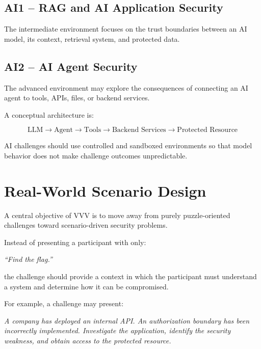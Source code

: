 \documentclass[11pt,a4paper]{article}
\begin{document}
\subsection{AI1 -- RAG and AI Application Security}

The intermediate environment focuses on the trust boundaries between
an AI model, its context, retrieval system, and protected data.


\subsection{AI2 -- AI Agent Security}

The advanced environment may explore the consequences of connecting
an AI agent to tools, APIs, files, or backend services.

A conceptual architecture is:

\[
\text{LLM}
\rightarrow
\text{Agent}
\rightarrow
\text{Tools}
\rightarrow
\text{Backend Services}
\rightarrow
\text{Protected Resource}
\]

AI challenges should use controlled and sandboxed environments so
that model behavior does not make challenge outcomes unpredictable.



\section{Real-World Scenario Design}

A central objective of VVV is to move away from purely puzzle-oriented
challenges toward scenario-driven security problems.

Instead of presenting a participant with only:

\begin{center}
\textit{``Find the flag.''}
\end{center}

the challenge should provide a context in which the participant must
understand a system and determine how it can be compromised.

For example, a challenge may present:

\begin{center}

\textit{
A company has deployed an internal API. An authorization boundary
has been incorrectly implemented. Investigate the application,
identify the security weakness, and obtain access to the protected
resource.
}

\end{center}
\end{document}
